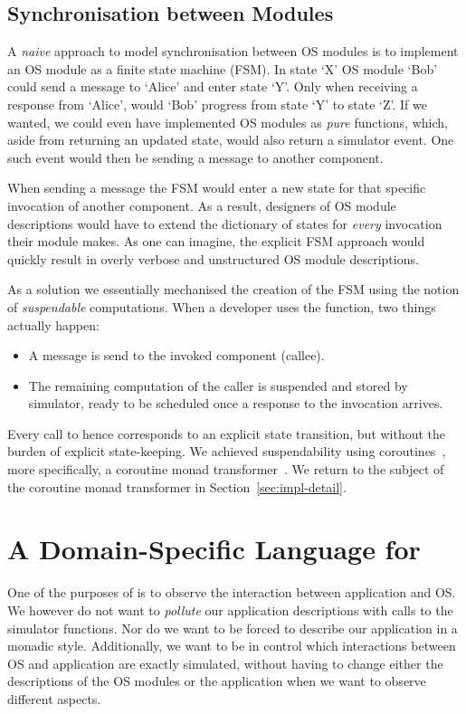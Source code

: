 \subsection{Synchronisation between Modules}
A \emph{naive} approach to model synchronisation between OS modules is to implement an OS module as a finite state machine (FSM).
In state `X' OS module `Bob' could send a message to `Alice' and enter state `Y'.
Only when receiving a response from `Alice', would `Bob' progress from state `Y' to state `Z'.
If we wanted, we could even have implemented OS modules as \emph{pure} functions, which, aside from returning an updated state, would also return a simulator event.
One such event would then be sending a message to another component.

When sending a message the FSM would enter a new state for that specific invocation of another component.
As a result, designers of OS module descriptions would have to extend the dictionary of states for \emph{every} invocation their module makes.
As one can imagine, the explicit FSM approach would quickly result in overly verbose and unstructured OS module descriptions.

As a solution we essentially mechanised the creation of the FSM using the notion of \emph{suspendable} computations.
When a developer uses the  function, two things actually happen:
\begin{itemize}
  \item A message is send to the invoked component (callee).
  \item The remaining computation of the caller is suspended and stored by simulator, ready to be scheduled once a response to the invocation arrives.
\end{itemize}
Every call to  hence corresponds to an explicit state transition, but without the burden of explicit state-keeping.
We achieved suspendability using coroutines~\cite{coroutines}, more specifically, a coroutine monad transformer~\cite{cmt}.
We return to the subject of the coroutine monad transformer in Section~\ref{sec:impl-detail}.

\section{A Domain-Specific Language for \soosim}
\label{sec:dsl}
One of the purposes of \soosim is to observe the interaction between application and OS.
We however do not want to \emph{pollute} our application descriptions with calls to the simulator functions.
Nor do we want to be forced to describe our application in a monadic style.
Additionally, we want to be in control which interactions between OS and application are exactly simulated, without having to change either the descriptions of the OS modules or the application when we want to observe different aspects.

